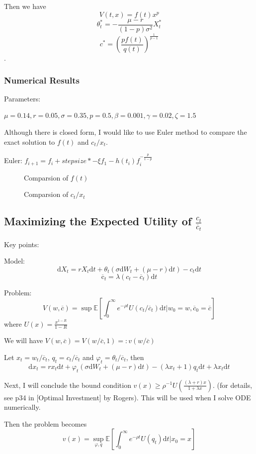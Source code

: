 \documentclass[a4paper]{article}
\theoremstyle{definition}
\numberwithin{equation}{section}
\begin{document}
Then we have
$$V(t,x)=f(t)x^p$$
$$\theta^*_t=-\frac{\mu-r}{(1-p)\sigma^2}X^*_t$$
$$c^*=\left(\frac{pf(t)}{q(t)}\right)^\frac{1}{p-1}$$.

\subsubsection{Numerical Results}
Parameters:

$\mu=0.14,r=0.05,\sigma=0.35,p=0.5,\beta=0.001,\gamma=0.02,\zeta=1.5$

Although there is closed form, I would like to use Euler method to compare the exact solution to $f(t)$ and $c_t/x_t$.

Euler: $f_{i+1}=f_i+stepsize*-\xi f_1-h(t_i)f_i^{-\frac{p}{1-p}}$
\begin{figure}[H]
\centering
{}
\caption{Comparsion of $f(t)$}
\label{fig:Pict}
\end{figure}
\begin{figure}[H]
\centering
{}
\caption{Comparsion of $c_t/x_t$}
\label{fig:Pict}
\end{figure}
\fi


\iffalse
\subsection{Maximizing the Expected Utility of $\frac{c_t}{\overline c_t}$}
Key points:

Model:
$$\mathrm dX_t=rX_t\mathrm dt+\theta_t(\sigma\mathrm dW_t+(\mu-r)\mathrm dt)-c_t\mathrm dt$$
$$\mathrm\overline c_t=\lambda(c_t-\overline c_t)\mathrm dt$$

Problem:
$$V(w,\overline c)=\sup\mathbb E[\int^\infty_0e^{-\rho t}U(c_t/\overline c_t)\mathrm dt\lvert w_0=w,\overline c_0=\overline c]$$
where $U(x)=\frac{x^{1-R}}{1-R}$

We will have $V(w,\overline c)=V(w/\overline c,1)=:v(w/\overline c)$

Let $x_t=w_t/\overline c_t$, $q_t=c_t/\overline c_t$ and $\varphi_t=\theta_t/\overline c_t$, then
$$\mathrm dx_t=rx_t\mathrm dt+\varphi_t(\sigma\mathrm dW_t+(\mu-r)\mathrm dt)-(\lambda x_t+1)q_t\mathrm dt+\lambda x_t\mathrm dt$$

Next, I will conclude the bound condition $v(x)\geq\rho^{-1}U\left(\frac{(\lambda+r)x}{1+\lambda x}\right)$. (for details, see p34 in [Optimal Investment] by Rogers). This will be used when I solve ODE numerically.

Then the problem becomes
$$v(x)=\sup_{\varphi,q}\mathbb E[\int^\infty_0e^{-\rho t}U(q_t)\mathrm dt\lvert x_0=x]$$
\end{document}

